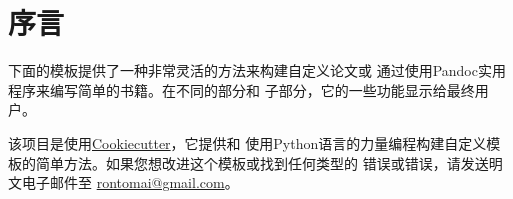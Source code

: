 \chapter*{序言}


下面的模板提供了一种非常灵活的方法来构建自定义论文或
通过使用Pandoc实用程序来编写简单的书籍。在不同的部分和
子部分，它的一些功能显示给最终用户。

该项目是使用\href{https://cookiecutter.readthedocs.io}{Cookiecutter}，它提供和
使用Python语言的力量编程构建自定义模板的简单方法。如果您想改进这个模板或找到任何类型的
错误或错误，请发送明文电子邮件至
\href{rontomai@gmail.com}{rontomai@gmail.com}。
